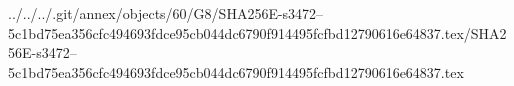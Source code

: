 ../../../.git/annex/objects/60/G8/SHA256E-s3472--5c1bd75ea356cfc494693fdce95cb044dc6790f914495fcfbd12790616e64837.tex/SHA256E-s3472--5c1bd75ea356cfc494693fdce95cb044dc6790f914495fcfbd12790616e64837.tex